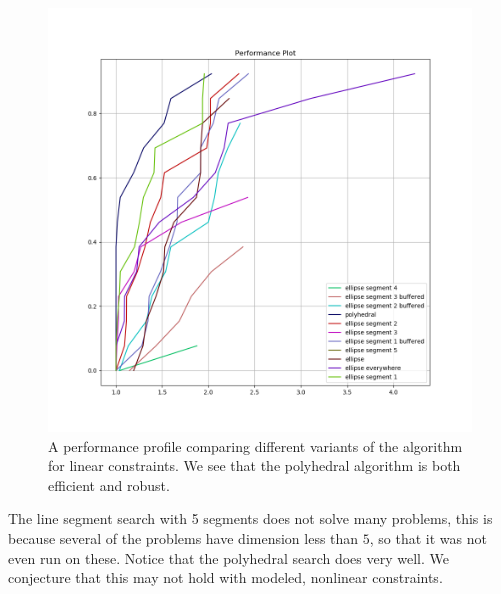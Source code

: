 	
\begin{figure}[ht]
    \centering
    \includegraphics[scale=0.4]{images/performance_profile_plot.png}
    \caption[A performance profile comparing variants of the algorithm for linear constraints.]{
    	A performance profile comparing different variants of the algorithm for linear constraints.
    	We see that the polyhedral algorithm is both efficient and robust.
    }
    \label{performance_profile_image}
\end{figure}



The line segment search with 5 segments does not solve many problems, this is because several of the problems have dimension less than $5$, so that it was not even run on these.
Notice that the polyhedral search does very well.
We conjecture that this may not hold with modeled, nonlinear constraints.



% 
% 
% 

